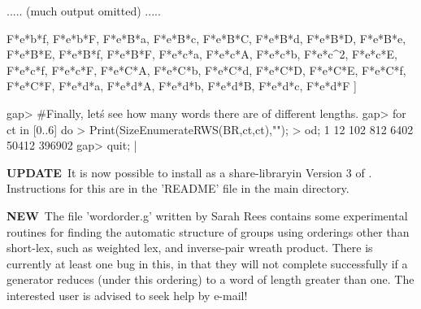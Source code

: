   .....  (much output omitted)   .....

  F*e*b*f, F*e*b*F, F*e*B*a, F*e*B*c, F*e*B*C, F*e*B*d, F*e*B*D, F*e*B*e, 
  F*e*B*E, F*e*B*f, F*e*B*F, F*e*c*a, F*e*c*A, F*e*c*b, F*e*c^2, F*e*c*E, 
  F*e*c*f, F*e*c*F, F*e*C*A, F*e*C*b, F*e*C*d, F*e*C*D, F*e*C*E, F*e*C*f, 
  F*e*C*F, F*e*d*a, F*e*d*A, F*e*d*b, F*e*d*B, F*e*d*c, F*e*d*F ]

gap> #Finally, let\'s see how many words there are of different lengths.
gap> for ct in [0..6] do
> Print(SizeEnumerateRWS(BR,ct,ct),"\n");
> od;
1
12
102
812
6402
50412
396902
gap> quit;
|

{\bf UPDATE}\:\ It is now possible to install
{\KBMAG} as a share-libraryin Version 3 of {\GAP}.
Instructions for this are in the 'README' file in
the main {\KBMAG} directory.

{\bf NEW}\:\ The file 'wordorder.g' written by Sarah Rees contains some
experimental routines for finding the automatic structure of groups using
orderings other than short-lex, such as weighted lex, and inverse-pair
wreath product. There is currently at least one bug in this, in that
they will not complete successfully if a generator reduces (under
this ordering) to a word of length greater than one. The interested
user is advised to seek help by e-mail!
